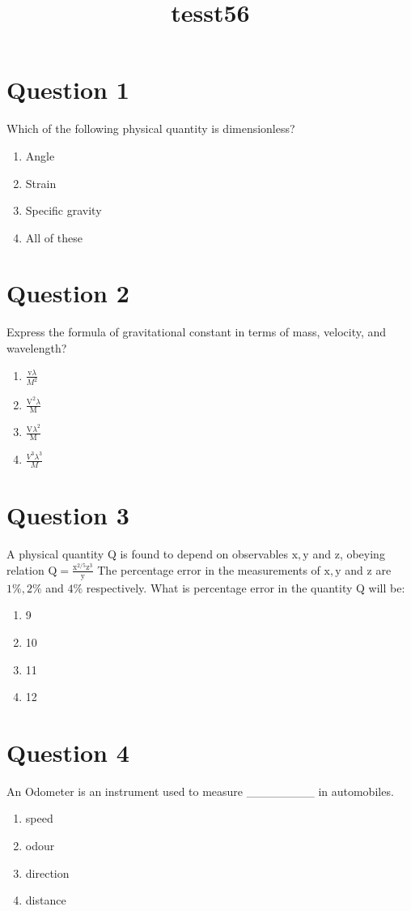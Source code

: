 \documentclass{article}
\title{tesst56}
\begin{document}
                    \maketitle
                    \section*{Question 1}
Which of the following physical quantity is dimensionless?\newline
\begin{enumerate}[label=(\alph*)]
\item Angle
\item Strain
\item Specific gravity
\item All of these
\end{enumerate}
\newpage
\section*{Question 2}
Express the formula of gravitational constant in terms of mass, velocity, and wavelength?
\begin{enumerate}[label=(\alph*)]
\item \(\frac{\mathrm{v} \lambda }{ M^{2}}\)
\item \(\frac{\mathrm{V}^{2} \lambda }{\mathrm{M}}\)
\item \(\frac{\mathrm{V} \lambda^{2}}{\mathrm{M}}\)
\item \(\frac{V^{3} \lambda^{3} }{ M}\)
\end{enumerate}
\newpage
\section*{Question 3}
A physical quantity Q is found to depend on observables \(\mathrm{x}, \mathrm{y}\) and \(\mathrm{z}\), obeying relation \(\mathrm{Q}=\frac{\mathrm{x}^{2 / 5} \mathrm{z}^{3}}{\mathrm{y}}\) The percentage error in the measurements of \(\mathrm{x}, \mathrm{y}\) and \(\mathrm{z}\) are \(1 \%, 2 \%\) and \(4 \%\) respectively. What is percentage error in the quantity Q will be:
\begin{enumerate}[label=(\alph*)]
\item 9 %
\item 10 %
\item 11 %
\item 12 %
\end{enumerate}
\newpage
\section*{Question 4}
An Odometer is an instrument used to measure ________ in automobiles.
\begin{enumerate}[label=(\alph*)]
\item speed
\item odour
\item direction
\item distance
\end{enumerate}
\newpage
\end{document}
